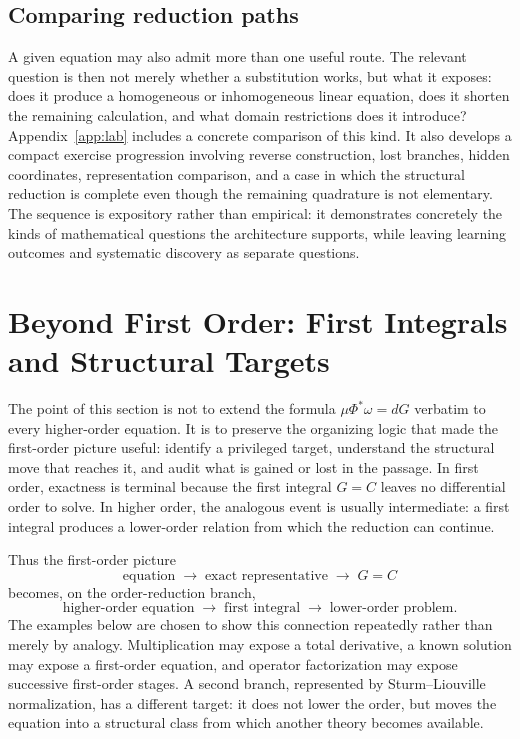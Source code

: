 \documentclass[11pt]{article}
\theoremstyle{definition}
\begin{document}
\subsection*{Comparing reduction paths}
A given equation may also admit more than one useful route. The relevant question is then not merely whether a substitution works, but what it exposes: does it produce a homogeneous or inhomogeneous linear equation, does it shorten the remaining calculation, and what domain restrictions does it introduce? Appendix~\ref{app:lab} includes a concrete comparison of this kind. It also develops a compact exercise progression involving reverse construction, lost branches, hidden coordinates, representation comparison, and a case in which the structural reduction is complete even though the remaining quadrature is not elementary. The sequence is expository rather than empirical: it demonstrates concretely the kinds of mathematical questions the architecture supports, while leaving learning outcomes and systematic discovery as separate questions.

\section{Beyond First Order: First Integrals and Structural Targets}

The point of this section is not to extend the formula \(\mu\Phi^*\omega=dG\) verbatim to every higher-order equation. It is to preserve the organizing logic that made the first-order picture useful: identify a privileged target, understand the structural move that reaches it, and audit what is gained or lost in the passage. In first order, exactness is terminal because the first integral \(G=C\) leaves no differential order to solve. In higher order, the analogous event is usually intermediate: a first integral produces a lower-order relation from which the reduction can continue.

Thus the first-order picture
\[
\boxed{\text{equation}\;\longrightarrow\;\text{exact representative}\;\longrightarrow\;G=C}
\]
becomes, on the order-reduction branch,
\[
\boxed{\text{higher-order equation}\;\longrightarrow\;\text{first integral}\;\longrightarrow\;\text{lower-order problem}}.
\]
The examples below are chosen to show this connection repeatedly rather than merely by analogy. Multiplication may expose a total derivative, a known solution may expose a first-order equation, and operator factorization may expose successive first-order stages. A second branch, represented by Sturm--Liouville normalization, has a different target: it does not lower the order, but moves the equation into a structural class from which another theory becomes available.
\end{document}
